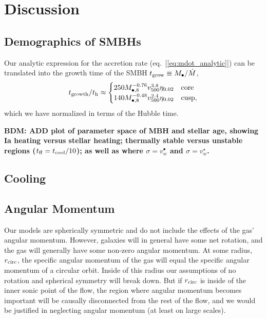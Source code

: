 \documentclass[usenatbib,fleqn]{mn2e}
\newcommand{\rcirc}{r_{\rm circ}}
\newcommand{\Mbheight}{M_{\bullet,8}}
\begin{document}
\section{Discussion}
\label{sec:discussion}

\subsection{Demographics of SMBHs}

Our analytic expression for the accretion rate (eq.~[\ref{eq:mdot_analytic}]) can be translated into the growth time of the SMBH $t_{\rm grow} \equiv M_{\bullet}/\dot{M}$,
\begin{eqnarray}
  t_{\rm growth}/t_{\rm h} \approx 
  \begin{cases}
    250 M_{\bullet,8}^{-0.76}
    v_{500}^{3.8}   \eta_{0.02}  & \text{core} \\
    140 \Mbheight^{-0.48}
    v_{500}^{2.4}   \eta_{0.02}  & \text{cusp}, 
  \end{cases}
  \label{eq:tgrow_analytic}
\end{eqnarray}
which we have normalized in terms of the Hubble time.  

{\bf BDM: ADD plot of parameter space of MBH and stellar age, showing Ia heating versus stellar heating; thermally stable versus unstable regions ($t_{\rm ff} = t_{\rm cool}/10$); as well as where $\sigma = v_{w}^{\bullet}$ and $\sigma = v_{w}^{\star}$.  }

\subsection{Cooling}
\label{sec:cooling}

  \subsection{Angular Momentum}
  \label{sec:ang}
  Our models are spherically symmetric and do not include the effects of
  the gas' angular momentum. However, galaxies will in general have some
  net rotation, and the gas will generally have some non-zero angular
  momentum. At some radius, $\rcirc$, the specific angular momentum of
  the gas will equal the specific angular momentum of a circular
  orbit. Inside of this radius our assumptions of no rotation and
  spherical symmetry will break down. But if $\rcirc$ is inside of the
  inner sonic point of the flow, the region where angular momentum
  becomes important will be causally disconnected from the rest of the
  flow, and we would be justified in neglecting angular momentum (at
  least on large scales).
\end{document}
